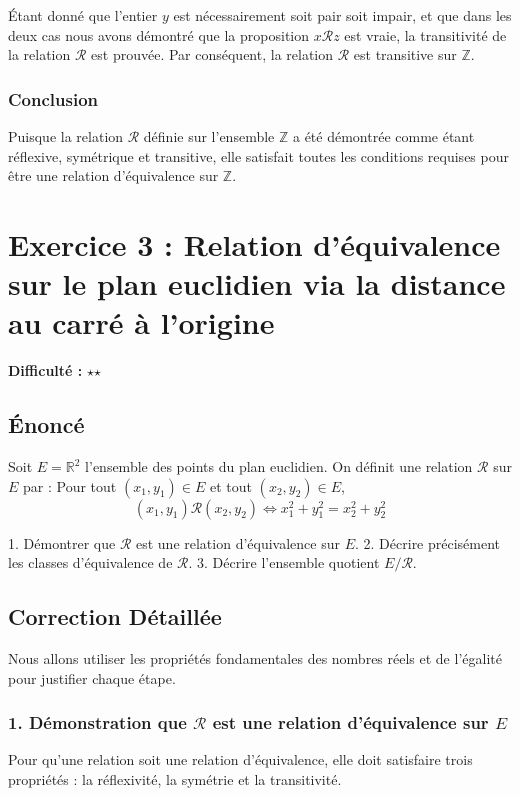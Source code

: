 \documentclass{report}
\begin{document}
Étant donné que l'entier $y$ est nécessairement soit pair soit impair, et que dans les deux cas nous avons démontré que la proposition $x \mathcal{R} z$ est vraie, la transitivité de la relation $\mathcal{R}$ est prouvée.
Par conséquent, la relation $\mathcal{R}$ est transitive sur $\mathbb{Z}$.

\subsection*{Conclusion}
Puisque la relation $\mathcal{R}$ définie sur l'ensemble $\mathbb{Z}$ a été démontrée comme étant réflexive, symétrique et transitive, elle satisfait toutes les conditions requises pour être une relation d'équivalence sur $\mathbb{Z}$.
\newpage
\chapter*{Exercice 3 : Relation d'équivalence sur le plan euclidien via la distance au carré à l'origine}
\textbf{Difficulté :} $\star$$\star$

\section*{Énoncé}
Soit $E = \mathbb{R}^2$ l'ensemble des points du plan euclidien.
On définit une relation $\mathcal{R}$ sur $E$ par :
Pour tout $(x_1, y_1) \in E$ et tout $(x_2, y_2) \in E$,
$$ (x_1, y_1) \mathcal{R} (x_2, y_2) \iff x_1^2 + y_1^2 = x_2^2 + y_2^2 $$

1.  Démontrer que $\mathcal{R}$ est une relation d'équivalence sur $E$.
2.  Décrire précisément les classes d'équivalence de $\mathcal{R}$.
3.  Décrire l'ensemble quotient $E/\mathcal{R}$.

\section*{Correction Détaillée}

Nous allons utiliser les propriétés fondamentales des nombres réels et de l'égalité pour justifier chaque étape.

\subsection*{1. Démonstration que $\mathcal{R}$ est une relation d'équivalence sur $E$}

Pour qu'une relation soit une relation d'équivalence, elle doit satisfaire trois propriétés : la réflexivité, la symétrie et la transitivité.
\end{document}
